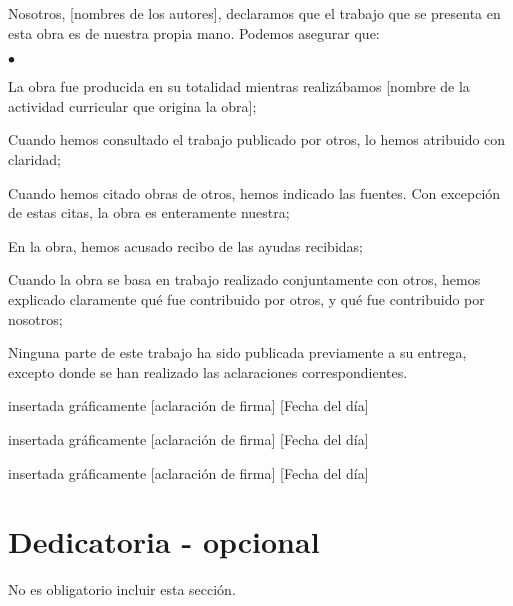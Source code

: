 \documentclass[12pt,a4paper,oneside]{book}
\begin{document}
Nosotros, [nombres de los autores], declaramos que el trabajo que se presenta en esta obra es de nuestra
propia mano. Podemos asegurar que:
\begin{list}{$\bullet$}{}
	\item La obra fue producida en su totalidad mientras realizábamos [nombre de la actividad curricular que origina la obra];
	\item Cuando hemos consultado el trabajo publicado por otros, lo hemos atribuido con claridad;
	\item Cuando hemos citado obras de otros, hemos indicado las fuentes. Con excepción de estas citas, la obra es enteramente nuestra;
	\item En la obra, hemos acusado recibo de las ayudas recibidas;
	\item Cuando la obra se basa en trabajo realizado conjuntamente con otros, hemos explicado claramente qué fue contribuido por otros, y qué fue contribuido por nosotros;
	\item Ninguna parte de este trabajo ha sido publicada previamente a su entrega, excepto donde se han realizado las aclaraciones correspondientes.
\end{list}

 
\vspace{2cm}




\begin{minipage}[b]{0.33333\textwidth}
 \par
insertada gráficamente
[aclaración de firma]
[Fecha del día]
\end{minipage}%
\begin{minipage}[b]{0.33333\textwidth}
 \par
insertada gráficamente
[aclaración de firma]
[Fecha del día]
\end{minipage}%
\begin{minipage}[b]{0.33333\textwidth}
 \par
insertada gráficamente
[aclaración de firma]
[Fecha del día]
\end{minipage}%

\chapter*{Dedicatoria - opcional}
No es obligatorio incluir esta sección.
\end{document}
